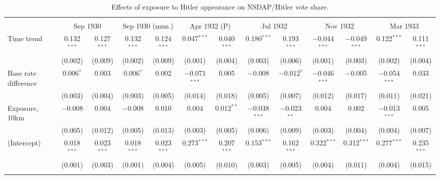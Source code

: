 
\begin{table}[!htbp] \centering 
  \caption{Effects of exposure to Hitler appearance on NSDAP/Hitler vote share.\vspace{-.25cm}} 
  \label{tab:nsdap-voteshare-dd} 
\scriptsize 
\begin{tabular}{@{\extracolsep{5pt}}lcccccccccccc} 
\\[-1.8ex]\hline 
\hline \\[-1.8ex] 
 & \multicolumn{2}{c}{Sep 1930} & \multicolumn{2}{c}{Sep 1930 (mun.)} & \multicolumn{2}{c}{Apr 1932 (P)} & \multicolumn{2}{c}{Jul 1932} & \multicolumn{2}{c}{Nov 1932} & \multicolumn{2}{c}{Mar 1933} \\ 
 \cmidrule(r){2-3}\cmidrule(r){4-5}\cmidrule(r){6-7}\cmidrule(r){8-9}\cmidrule(r){10-11}\cmidrule(r){12-13}Time trend & 0.132$^{***}$ & 0.127$^{***}$ & 0.132$^{***}$ & 0.124$^{***}$ & 0.047$^{***}$ & 0.040$^{***}$ & 0.180$^{***}$ & 0.193$^{***}$ & $-$0.044$^{***}$ & $-$0.049$^{***}$ & 0.122$^{***}$ & 0.111$^{***}$ \\ 
  & (0.002) & (0.009) & (0.002) & (0.009) & (0.001) & (0.004) & (0.003) & (0.006) & (0.001) & (0.003) & (0.002) & (0.004) \\ 
  Base rate difference & 0.006$^{*}$ & 0.003 & 0.006$^{*}$ & 0.002 & $-$0.071$^{***}$ & 0.005 & $-$0.008 & $-$0.012$^{*}$ & $-$0.046$^{***}$ & $-$0.005 & $-$0.054$^{***}$ & 0.033 \\ 
  & (0.003) & (0.004) & (0.003) & (0.005) & (0.014) & (0.018) & (0.005) & (0.007) & (0.012) & (0.017) & (0.011) & (0.021) \\ 
  Exposure, 10km & $-$0.008 & 0.004 & $-$0.008 & 0.010 & 0.004 & 0.012$^{**}$ & $-$0.038$^{***}$ & $-$0.023$^{**}$ & 0.004 & 0.002 & $-$0.013$^{***}$ & 0.005 \\ 
  & (0.005) & (0.012) & (0.005) & (0.013) & (0.003) & (0.005) & (0.006) & (0.009) & (0.003) & (0.004) & (0.004) & (0.007) \\ 
  (Intercept) & 0.018$^{***}$ & 0.023$^{***}$ & 0.018$^{***}$ & 0.023$^{***}$ & 0.273$^{***}$ & 0.207$^{***}$ & 0.153$^{***}$ & 0.162$^{***}$ & 0.322$^{***}$ & 0.312$^{***}$ & 0.277$^{***}$ & 0.235$^{***}$ \\ 
  & (0.001) & (0.003) & (0.001) & (0.004) & (0.005) & (0.010) & (0.003) & (0.005) & (0.004) & (0.011) & (0.004) & (0.015) \\ 
 \hline \\[-1.8ex] 

\end{tabular}
\end{table}
